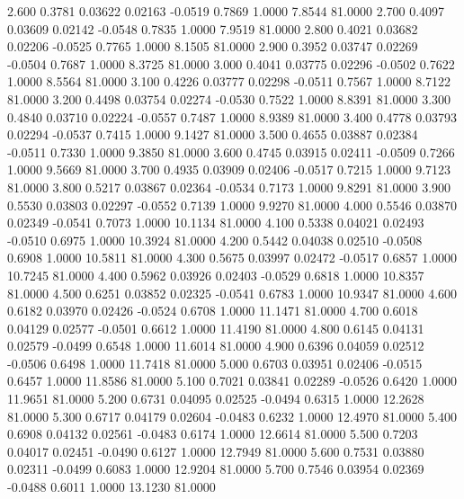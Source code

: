    2.600   0.3781   0.03622   0.02163  -0.0519   0.7869   1.0000   7.8544  81.0000
   2.700   0.4097   0.03609   0.02142  -0.0548   0.7835   1.0000   7.9519  81.0000
   2.800   0.4021   0.03682   0.02206  -0.0525   0.7765   1.0000   8.1505  81.0000
   2.900   0.3952   0.03747   0.02269  -0.0504   0.7687   1.0000   8.3725  81.0000
   3.000   0.4041   0.03775   0.02296  -0.0502   0.7622   1.0000   8.5564  81.0000
   3.100   0.4226   0.03777   0.02298  -0.0511   0.7567   1.0000   8.7122  81.0000
   3.200   0.4498   0.03754   0.02274  -0.0530   0.7522   1.0000   8.8391  81.0000
   3.300   0.4840   0.03710   0.02224  -0.0557   0.7487   1.0000   8.9389  81.0000
   3.400   0.4778   0.03793   0.02294  -0.0537   0.7415   1.0000   9.1427  81.0000
   3.500   0.4655   0.03887   0.02384  -0.0511   0.7330   1.0000   9.3850  81.0000
   3.600   0.4745   0.03915   0.02411  -0.0509   0.7266   1.0000   9.5669  81.0000
   3.700   0.4935   0.03909   0.02406  -0.0517   0.7215   1.0000   9.7123  81.0000
   3.800   0.5217   0.03867   0.02364  -0.0534   0.7173   1.0000   9.8291  81.0000
   3.900   0.5530   0.03803   0.02297  -0.0552   0.7139   1.0000   9.9270  81.0000
   4.000   0.5546   0.03870   0.02349  -0.0541   0.7073   1.0000  10.1134  81.0000
   4.100   0.5338   0.04021   0.02493  -0.0510   0.6975   1.0000  10.3924  81.0000
   4.200   0.5442   0.04038   0.02510  -0.0508   0.6908   1.0000  10.5811  81.0000
   4.300   0.5675   0.03997   0.02472  -0.0517   0.6857   1.0000  10.7245  81.0000
   4.400   0.5962   0.03926   0.02403  -0.0529   0.6818   1.0000  10.8357  81.0000
   4.500   0.6251   0.03852   0.02325  -0.0541   0.6783   1.0000  10.9347  81.0000
   4.600   0.6182   0.03970   0.02426  -0.0524   0.6708   1.0000  11.1471  81.0000
   4.700   0.6018   0.04129   0.02577  -0.0501   0.6612   1.0000  11.4190  81.0000
   4.800   0.6145   0.04131   0.02579  -0.0499   0.6548   1.0000  11.6014  81.0000
   4.900   0.6396   0.04059   0.02512  -0.0506   0.6498   1.0000  11.7418  81.0000
   5.000   0.6703   0.03951   0.02406  -0.0515   0.6457   1.0000  11.8586  81.0000
   5.100   0.7021   0.03841   0.02289  -0.0526   0.6420   1.0000  11.9651  81.0000
   5.200   0.6731   0.04095   0.02525  -0.0494   0.6315   1.0000  12.2628  81.0000
   5.300   0.6717   0.04179   0.02604  -0.0483   0.6232   1.0000  12.4970  81.0000
   5.400   0.6908   0.04132   0.02561  -0.0483   0.6174   1.0000  12.6614  81.0000
   5.500   0.7203   0.04017   0.02451  -0.0490   0.6127   1.0000  12.7949  81.0000
   5.600   0.7531   0.03880   0.02311  -0.0499   0.6083   1.0000  12.9204  81.0000
   5.700   0.7546   0.03954   0.02369  -0.0488   0.6011   1.0000  13.1230  81.0000

